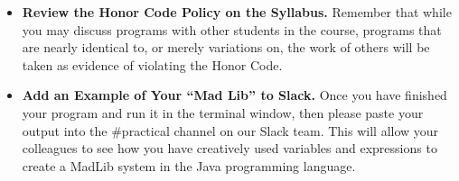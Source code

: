 \begin{itemize}
\item {\bf Review the Honor Code Policy on the Syllabus.} Remember that while you may discuss programs with other
  students in the course, programs that are nearly identical to, or merely variations on, the work of others will be
  taken as evidence of violating the Honor Code.

\item {\bf Add an Example of Your ``Mad Lib'' to Slack.} Once you have finished your program and run it in the terminal
  window, then please paste your output into the \#practical channel on our Slack team. This will allow your colleagues
  to see how you have creatively used variables and expressions to create a MadLib system in the Java programming
  language.

\end{itemize}

